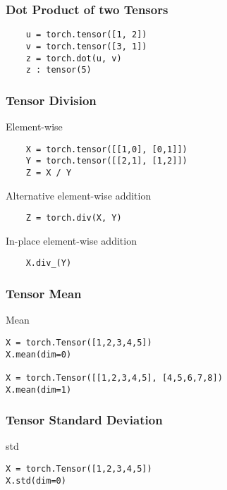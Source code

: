 \documentclass[14 pt]{beamer}
\begin{document}
\begin{frame}[fragile]
  \frametitle{Dot Product of two Tensors}
  \begin{block}{}
\begin{verbatim}
    u = torch.tensor([1, 2]) 
    v = torch.tensor([3, 1])
    z = torch.dot(u, v) 
    z : tensor(5)
\end{verbatim}
  \end{block}
\end{frame}


\begin{frame}[fragile]
  \frametitle{Tensor Division}
  \begin{block}{Element-wise}
\begin{verbatim}
    X = torch.tensor([[1,0], [0,1]]) 
    Y = torch.tensor([[2,1], [1,2]]) 
    Z = X / Y 
\end{verbatim}
  \end{block}
  \begin{block}{Alternative element-wise addition}
\begin{verbatim}
    Z = torch.div(X, Y)
\end{verbatim}
  \end{block}
  \begin{block}{In-place element-wise addition}
\begin{verbatim}
    X.div_(Y) 
\end{verbatim}
  \end{block}
\end{frame}


\begin{frame}[fragile]
  \frametitle{Tensor Mean}
  \begin{block}{Mean}
\begin{verbatim}
X = torch.Tensor([1,2,3,4,5])
X.mean(dim=0)

X = torch.Tensor([[1,2,3,4,5], [4,5,6,7,8])
X.mean(dim=1)
\end{verbatim}
  \end{block}
\end{frame}

\begin{frame}[fragile]
  \frametitle{Tensor Standard Deviation}
  \begin{block}{std}
\begin{verbatim}
X = torch.Tensor([1,2,3,4,5])
X.std(dim=0)
\end{verbatim}
  \end{block}
\end{frame}
\end{document}

